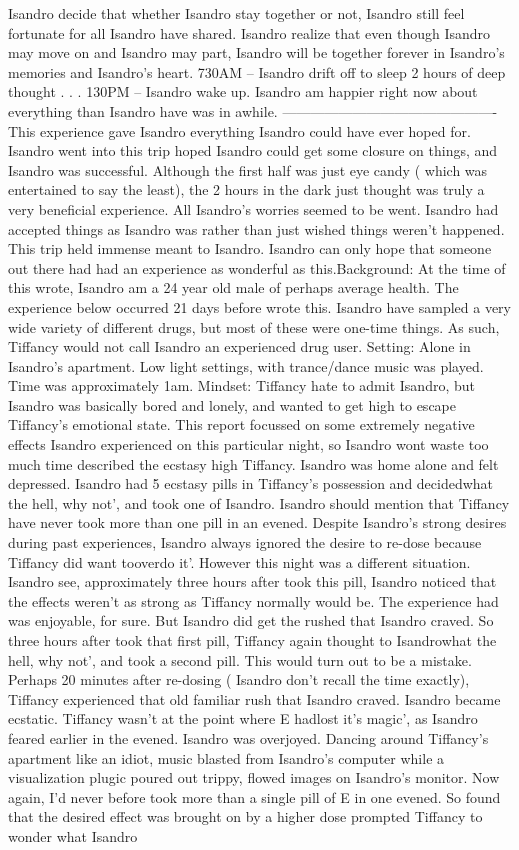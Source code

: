 \documentclass[12pt]{book}
\begin{document}
Isandro decide that whether Isandro stay together or not, Isandro still feel fortunate for all Isandro have shared. Isandro realize that even though Isandro may move on and Isandro may part, Isandro will be together forever in Isandro's memories and Isandro's heart. 730AM -- Isandro drift off to sleep 2 hours of deep thought . . .  130PM -- Isandro wake up. Isandro am happier right now about everything than Isandro have was in awhile. ---------------------------------------------- This experience gave Isandro everything Isandro could have ever hoped for. Isandro went into this trip hoped Isandro could get some closure on things, and Isandro was successful. Although the first half was just eye candy ( which was entertained to say the least), the 2 hours in the dark just thought was truly a very beneficial experience. All Isandro's worries seemed to be went. Isandro had accepted things as Isandro was rather than just wished things weren't happened. This trip held immense meant to Isandro. Isandro can only hope that someone out there had had an experience as wonderful as this.Background: At the time of this wrote, Isandro am a 24 year old male of perhaps average health. The experience below occurred 21 days before wrote this. Isandro have sampled a very wide variety of different drugs, but most of these were one-time things. As such, Tiffancy would not call Isandro an experienced drug user. Setting: Alone in Isandro's apartment. Low light settings, with trance/dance music was played. Time was approximately 1am. Mindset: Tiffancy hate to admit Isandro, but Isandro was basically bored and lonely, and wanted to get high to escape Tiffancy's emotional state. This report focussed on some extremely negative effects Isandro experienced on this particular night, so Isandro wont waste too much time described the ecstasy high Tiffancy. Isandro was home alone and felt depressed. Isandro had 5 ecstasy pills in Tiffancy's possession and decidedwhat the hell, why not', and took one of Isandro. Isandro should mention that Tiffancy have never took more than one pill in an evened. Despite Isandro's strong desires during past experiences, Isandro always ignored the desire to re-dose because Tiffancy did want tooverdo it'. However this night was a different situation. Isandro see, approximately three hours after took this pill, Isandro noticed that the effects weren't as strong as Tiffancy normally would be. The experience had was enjoyable, for sure. But Isandro did get the rushed that Isandro craved. So three hours after took that first pill, Tiffancy again thought to Isandrowhat the hell, why not', and took a second pill. This would turn out to be a mistake. Perhaps 20 minutes after re-dosing ( Isandro don't recall the time exactly), Tiffancy experienced that old familiar rush that Isandro craved. Isandro became ecstatic. Tiffancy wasn't at the point where E hadlost it's magic', as Isandro feared earlier in the evened. Isandro was overjoyed. Dancing around Tiffancy's apartment like an idiot, music blasted from Isandro's computer while a visualization plugic poured out trippy, flowed images on Isandro's monitor. Now again, I'd never before took more than a single pill of E in one evened. So found that the desired effect was brought on by a higher dose prompted Tiffancy to wonder what Isandro 
\end{document}
